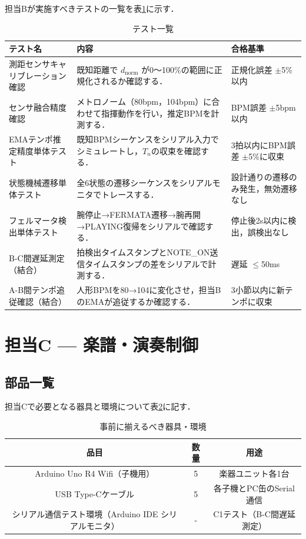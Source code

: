 \documentclass[lualatex,book,paper=a4paper,jafontsize=11.5pt,jafontscale=1.05,oneside]{jlreq}
\begin{document}
担当Bが実施すべきテストの一覧を表\ref{tab:test}に示す．

\begin{table}[H]
\centering
\caption{テスト一覧}
\label{tab:test}
\begin{tabular}{p{3.5cm}p{5cm}p{4cm}}
\hline
\textbf{テスト名} & \textbf{内容} & \textbf{合格基準} \\
\hline
測距センサキャリブレーション確認 &
既知距離で $d_{\text{norm}}$ が0〜100\%の範囲に正規化されるか確認する． &
正規化誤差 $\pm$5\%以内 \\
\hline
センサ融合精度確認 &
メトロノーム（80bpm，104bpm）に合わせて指揮動作を行い，推定BPMを計測する． &
BPM誤差 $\pm$5bpm以内 \\
\hline
EMAテンポ推定精度単体テスト &
既知BPMシーケンスをシリアル入力でシミュレートし，$T_n$の収束を確認する． &
3拍以内にBPM誤差 $\pm$5\%に収束 \\
\hline
状態機械遷移単体テスト &
全6状態の遷移シーケンスをシリアルモニタでトレースする． &
設計通りの遷移のみ発生，無効遷移なし \\
\hline
フェルマータ検出単体テスト &
腕停止→FERMATA遷移→腕再開→PLAYING復帰をシリアルで確認する． &
停止後2s以内に検出，誤検出なし \\
\hline
B-C間遅延測定（結合） &
拍検出タイムスタンプとNOTE\_ON送信タイムスタンプの差をシリアルで計測する． &
遅延 $\leq$50ms \\
\hline
A-B間テンポ追従確認（結合） &
人形BPMを80→104に変化させ，担当BのEMAが追従するか確認する． &
3小節以内に新テンポに収束 \\
\hline
\end{tabular}
\end{table} \section{担当C — 楽譜・演奏制御}

\subsection{部品一覧}
担当Cで必要となる器具と環境について表\ref{need}に記す．

\begin{table}[H]
  \centering
  \caption{事前に揃えるべき器具・環境}
  \label{need}
  \begin{tabular}{|c|c|c|}
\hline
品目 & 数量 & 用途 \\\hline \hline
Arduino Uno R4 Wifi（子機用） & 5 & 楽器ユニット各1台 \\ \hline
USB Type-Cケーブル & 5 & 各子機とPC缶のSerial通信 \\ \hline
シリアル通信テスト環境（Arduino IDE シリアルモニタ）& - & C1テスト（B-C間遅延測定） \\ \hline
  \end{tabular}  
\end{table}
\end{document}
